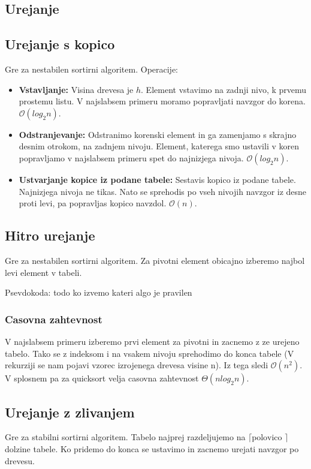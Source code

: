 \documentclass{article}
\begin{document}
\begin{multicols}{2}
	\section{Urejanje}
	\subsection{Urejanje s kopico}
	Gre za nestabilen sortirni algoritem.
	Operacije:
	\begin{itemize}
		\item \textbf{Vstavljanje:} Visina drevesa je $h$. Element vstavimo na zadnji nivo, k prvemu prostemu listu. V najslabsem primeru moramo popravljati navzgor do korena. $\mathcal{O}(log_2 n)$.
		\item \textbf{Odstranjevanje: } Odstranimo korenski element in ga zamenjamo s skrajno desnim otrokom, na zadnjem nivoju. Element, katerega smo ustavili v koren popravljamo v najslabsem primeru spet do najnizjega nivoja. $\mathcal{O}(log_2 n)$.
		\item \textbf{Ustvarjanje kopice iz podane tabele:} Sestavis kopico iz podane tabele. Najnizjega nivoja ne tikas. Nato se sprehodis po vseh nivojih navzgor iz desne proti levi, pa popravljas kopico navzdol. $\mathcal{O}(n)$.
	\end{itemize}
	\subsection{Hitro urejanje}
	Gre za nestabilen sortirni algoritem. Za pivotni element obicajno izberemo najbol levi element v tabeli.

	Psevdokoda:
	todo ko izvemo kateri algo je pravilen

	\subsubsection{Casovna zahtevnost}
	V najslabsem primeru izberemo prvi element za pivotni in zacnemo z ze urejeno tabelo. Tako se z indeksom i na vsakem nivoju sprehodimo do konca tabele (V rekurziji se nam pojavi vzorec izrojenega drevesa visine n). Iz tega sledi $\mathcal{O}(n^2)$. V splosnem pa za quicksort velja casovna zahtevnost $\Theta (nlog_2 n)$.

	\subsection{Urejanje z zlivanjem}
	Gre za stabilni sortirni algoritem.
	Tabelo najprej razdeljujemo na $\lceil \text{polovico }\rceil$ dolzine tabele.
	Ko pridemo do konca se ustavimo in zacnemo urejati navzgor po drevesu.


\end{multicols}
\end{document}
